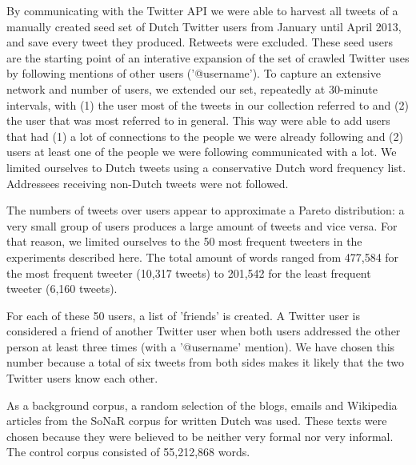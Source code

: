 \documentclass[11pt]{article}
\begin{document}
By communicating with the Twitter API we were able to harvest all tweets of a manually created seed set of Dutch Twitter users from January until April 2013, and save every tweet they produced. Retweets were excluded. These seed users are the starting point of an interative expansion of the set of crawled Twitter uses by following mentions of other users ('@username'). To capture an extensive network and number of users, we extended our set, repeatedly at 30-minute intervals, with (1) the user most of the tweets in our collection referred to and (2) the user that was most referred to in general. This way were able to add users that had (1) a lot of connections to the people we were already following and (2) users at least one of the people we were following communicated with a lot. We limited ourselves to Dutch tweets using a conservative Dutch word frequency list. Addressees receiving non-Dutch tweets were not followed.

The numbers of tweets over users appear to approximate a Pareto distribution: a very small group of users produces a large amount of tweets and vice versa. For that reason, we limited ourselves to the 50 most frequent tweeters in the experiments described here. The total amount of words ranged from 477,584 for the most frequent tweeter (10,317 tweets) to 201,542 for the least frequent tweeter (6,160 tweets). 

For each of these 50 users, a list of 'friends' is created. A Twitter user is considered a friend of another Twitter user when both users addressed the other person at least three times (with a '@username' mention). We have chosen this number because a total of six tweets from both sides makes it likely that the two Twitter users know each other. 

As a background corpus, a random selection of the blogs, emails and Wikipedia articles from the SoNaR corpus for written Dutch \cite{oostdijk13} was used. These texts were chosen because they were believed to be neither very formal nor very informal. The control corpus consisted of 55,212,868 words.
\end{document}
